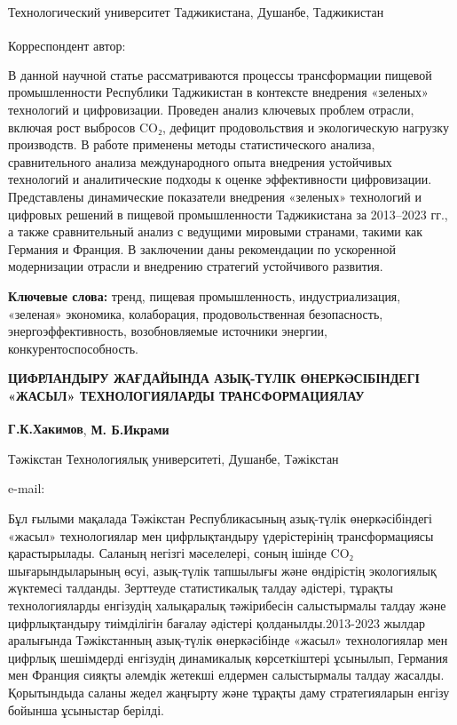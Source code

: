 Технологический университет Таджикистана, Душанбе, Таджикистан

{\bfseries \textsuperscript{\envelope }} Корреспондент автор:
\href{mailto:gafurjon-68@mail.ru}{}

В данной научной статье рассматриваются процессы трансформации пищевой
промышленности Республики Таджикистан в контексте внедрения «зеленых»
технологий и цифровизации. Проведен анализ ключевых проблем отрасли,
включая рост выбросов CO₂, дефицит продовольствия и экологическую
нагрузку производств. В работе применены методы статистического анализа,
сравнительного анализа международного опыта внедрения устойчивых
технологий и аналитические подходы к оценке эффективности цифровизации.
Представлены динамические показатели внедрения «зеленых» технологий и
цифровых решений в пищевой промышленности Таджикистана за 2013--2023
гг., а также сравнительный анализ с ведущими мировыми странами, такими
как Германия и Франция. В заключении даны рекомендации по ускоренной
модернизации отрасли и внедрению стратегий устойчивого развития.

{\bfseries Ключевые слова:} тренд, пищевая промышленность,
индустриализация, «зеленая» экономика, колаборация, продовольственная
безопасность, энергоэффективность, возобновляемые источники энергии,
конкурентоспособность.

{\bfseries ЦИФРЛАНДЫРУ ЖАҒДАЙЫНДА АЗЫҚ-ТҮЛІК ӨНЕРКӘСІБІНДЕГІ «ЖАСЫЛ»
ТЕХНОЛОГИЯЛАРДЫ ТРАНСФОРМАЦИЯЛАУ}

{\bfseries Г.К.Хакимов\textsuperscript{\envelope }}, {\bfseries М. Б.Икрами}

Тәжікстан Технологиялық университеті, Душанбе, Тәжікстан

e-mail:\href{mailto:gafurjon-68@mail.ru}{}

Бұл ғылыми мақалада Тәжікстан Республикасының азық-түлік өнеркәсібіндегі
«жасыл» технологиялар мен цифрлықтандыру үдерістерінің трансформациясы
қарастырылады. Саланың негізгі мәселелері, соның ішінде CO₂
шығарындыларының өсуі, азық-түлік тапшылығы және өндірістің экологиялық
жүктемесі талданды. Зерттеуде статистикалық талдау әдістері, тұрақты
технологияларды енгізудің халықаралық тәжірибесін салыстырмалы талдау
және цифрлықтандыру тиімділігін бағалау әдістері қолданылды.2013-2023
жылдар аралығында Тәжікстанның азық-түлік өнеркәсібінде «жасыл»
технологиялар мен цифрлық шешімдерді енгізудің динамикалық көрсеткіштері
ұсынылып, Германия мен Франция сияқты әлемдік жетекші елдермен
салыстырмалы талдау жасалды. Қорытындыда саланы жедел жаңғырту және
тұрақты даму стратегияларын енгізу бойынша ұсыныстар берілді.

